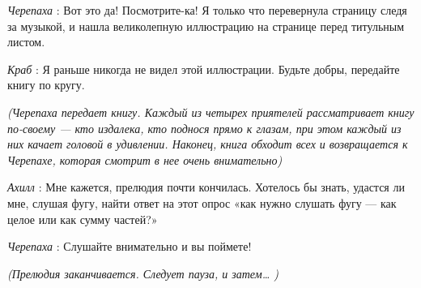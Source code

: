 \emph{Черепаха} : Вот это да! Посмотрите-ка! Я только что перевернула страницу следя за музыкой, и нашла великолепную иллюстрацию на странице перед титульным листом.

\emph{Краб} : Я раньше никогда не видел этой иллюстрации. Будьте добры, передайте книгу по кругу.

\emph{(Черепаха передает книгу. Каждый из четырех приятелей рассматривает книгу по-своему --- кто издалека, кто поднося прямо к глазам, при этом каждый из них качает головой в удивлении. Наконец, книга обходит всех и возвращается к Черепахе, которая смотрит в нее очень внимательно)}

\emph{Ахилл} : Мне кажется, прелюдия почти кончилась. Хотелось бы знать, удастся ли мне, слушая фугу, найти ответ на этот опрос «как нужно слушать фугу --- как целое или как сумму частей?»

\emph{Черепаха} : Слушайте внимательно и вы поймете!

\emph{(Прелюдия заканчивается. Следует пауза, и затем\ldots{} )}

